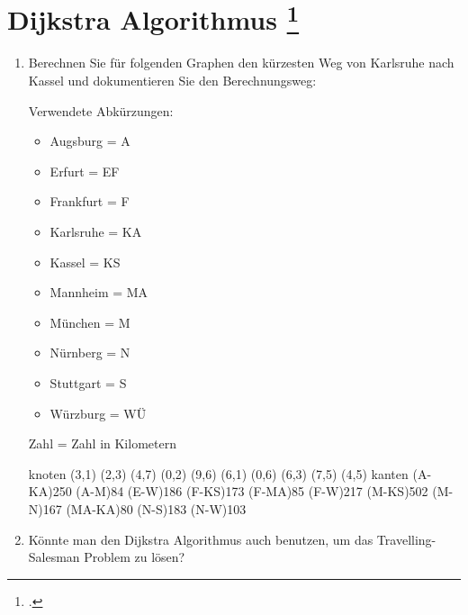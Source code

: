 \documentclass{lehramt-informatik-aufgabe}
\begin{document}

\section{Dijkstra Algorithmus
\footcite[Thema 2 Aufgabe 6 Seite 9]{examen:66115:2016:03}}

\begin{enumerate}


\item Berechnen Sie für folgenden Graphen den kürzesten Weg von
Karlsruhe nach Kassel und dokumentieren Sie den Berechnungsweg:

Verwendete Abkürzungen:

\begin{itemize}
\item Augsburg = A
\item Erfurt = EF
\item Frankfurt = F
\item Karlsruhe = KA
\item Kassel = KS
\item Mannheim = MA
\item München = M
\item Nürnberg = N
\item Stuttgart = S
\item Würzburg = WÜ
\end{itemize}

Zahl = Zahl in Kilometern

\begin{center}
\graph knoten {
  (3,1)
  (2,3)
  (4,7)
  (0,2)
  (9,6)
  (6,1)
  (0,6)
  (6,3)
  (7,5)
  (4,5)
} kanten {
  \kante(A-KA){250}
  \kante(A-M){84}
  \kante(E-W){186}
  \kante(F-KS){173}
  \kante(F-MA){85}
  \kante(F-W){217}
  \kante(M-KS){502}
  \kante(M-N){167}
  \kante(MA-KA){80}
  \kante(N-S){183}
  \kante(N-W){103}
}
\end{center}


\item Könnte man den Dijkstra Algorithmus auch benutzen, um das
Travelling-Salesman Problem zu lösen?

\end{enumerate}
\end{document}
